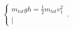 \begin{equation}
    \begin{cases}
      m_{tot} g h = \frac{1}{2} m_{tot} v_1^2\\
      \left\lvert
    \end{cases}\,.
\end{equation}